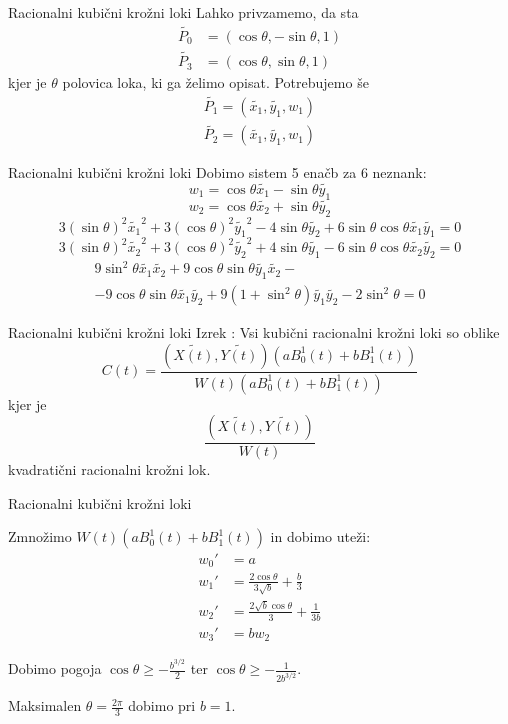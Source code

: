 \documentclass[t]{beamer}
\begin{document}
\begin{frame}{Racionalni kubični krožni loki}
Lahko privzamemo, da sta 
\begin{align*}
\tilde{P_{0}} &= (\cos \theta, - \sin \theta, 1) \\
\tilde{P_{3}} &= (\cos \theta, \sin \theta, 1)
\end{align*}
kjer je $\theta$ polovica loka, ki ga želimo opisat. 
Potrebujemo še 
\begin{align*}
\tilde{P_{1}} = (\tilde{x_{1}}, \tilde{y_{1}}, w_{1}) \\
\tilde{P_{2}} = (\tilde{x_{1}}, \tilde{y_{1}}, w_{1})
\end{align*}

\end{frame}

\begin{frame}{Racionalni kubični krožni loki}
Dobimo sistem 5 enačb za 6 neznank:
$$
w_{1} = \cos \theta \tilde{x_{1}} - \sin \theta  \tilde{y_{1}} 
$$
$$
w_{2} = \cos \theta  \tilde{x_{2}} + \sin \theta  \tilde{y_{2}} 
$$
$$
3(\sin \theta )^{2} \tilde{x_{1}}^2 + 3(\cos \theta )^{2} \tilde{y_{1}}^2 - 4 \sin \theta \tilde{y_{2}} + 6\sin \theta \cos \theta \tilde{x_{1}}\tilde{y_{1}} = 0 
$$
$$
3(\sin \theta )^{2} \tilde{x_{2}}^2 + 3(\cos \theta )^{2} \tilde{y_{2}}^2 + 4 \sin \theta 
\tilde{y_{1}} - 6\sin \theta \cos \theta \tilde{x_{2}}\tilde{y_{2}} = 0 
$$
\begin{align*}
9\sin^{2}\theta \tilde{x_{1}}\tilde{x_{2}} + 9 \cos \theta \sin \theta \tilde{y_{1}}\tilde{x_{2}} -\\ -9\cos \theta \sin \theta \tilde{x_{1}} \tilde{y_{2}} + 9 (1 + \sin^2 \theta) \tilde{y_{1}} \tilde{y_{2}} - 2\sin^2\theta = 0
\end{align*}

\end{frame}

\begin{frame}{Racionalni kubični krožni loki}
Izrek : Vsi kubični racionalni krožni loki so oblike 
$$
C(t) = \frac{(\tilde{X(t)}, \tilde{Y(t)})(aB_{0}^1(t) + bB_{1}^1(t))}{W(t)(aB_{0}^1(t) + bB_{1}^1(t))}
$$
kjer je 
$$
\frac{(\tilde{X(t)}, \tilde{Y(t)})}{W(t)}
$$
kvadratični racionalni krožni lok.
\end{frame}

\begin{frame}{Racionalni kubični krožni loki}

Zmnožimo $W(t)(aB_{0}^1(t) + bB_{1}^1(t))$ in dobimo uteži:
\begin{align*}
w_{0}' &= a \\
w_{1}' &=  \frac{2 \cos \theta}{3 \sqrt{b}} + \frac{b}{3} \\
w_{2}' &=  \frac{2 \sqrt{b} \cos \theta}{3} + \frac{1}{3b} \\
w_{3}' &= b w_{2} 
\end{align*}

Dobimo pogoja $\cos \theta \geq - \frac{b^{3/2}}{2}$ ter $\cos \theta \geq - \frac{1}{2b^{3/2}}$.

Maksimalen $\theta = \frac{2\pi}{3}$ dobimo pri $b = 1$. 

\end{frame}
\end{document}
